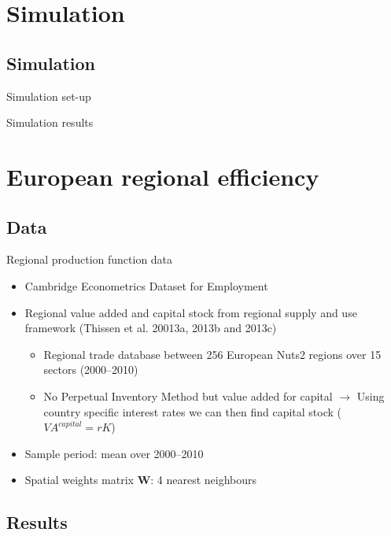 \documentclass[presentation]{beamer}
\begin{document}
\section{Simulation}

\subsection{Simulation}

\begin{frame}{Simulation set-up}

\end{frame}

\begin{frame}{Simulation results}

\end{frame}

\section{European regional efficiency}

\subsection{Data}

\begin{frame}{Regional production function data}
\begin{itemize}
	\item Cambridge Econometrics Dataset for Employment
	\item Regional value added and capital stock from regional supply and use framework (Thissen et al. 20013a, 2013b and 2013c) 
	\begin{itemize}
		\item Regional trade database between 256 European Nuts2 regions over 15 sectors (2000--2010)
		\item No Perpetual Inventory Method but value added for capital $\rightarrow$ Using country specific interest rates we can then find capital stock ($VA^{capital} = rK$)
	\end{itemize}
	\item Sample period: mean over 2000--2010
	\item Spatial weights matrix $\mathbf{W}$: 4 nearest neighbours
\end{itemize}
\end{frame}

\subsection{Results}
\end{document}
